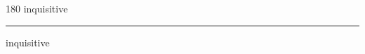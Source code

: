 
\begin{frame}
\begin{center}
\begin{turn}{180}
{\fontsize{2.5cm}{1em}\selectfont inquisitive}
\end{turn}
\vspace{1em}\par  
\hrule
\vspace{1em}\par  
{\fontsize{2.5cm}{1em}\selectfont inquisitive}
\end{center}
\end{frame}
